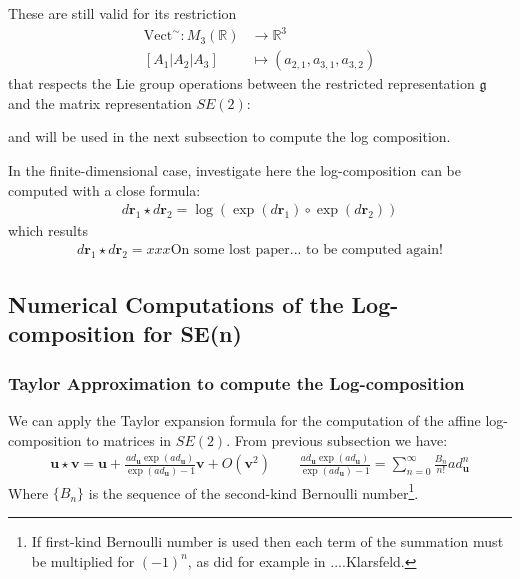 These are still valid for its restriction 
\begin{align*}
\text{Vect}^{\sim} : M_{3}(\mathbb{R}) & \longrightarrow \mathbb{R}^{3}\\
[A_1 \big| A_2  \big| A_3]
&\longmapsto  
(a_{2,1}, a_{3,1}, a_{3,2})
\end{align*}
that respects the Lie group operations between the restricted representation $\mathfrak{g}$ and the matrix representation $SE(2)$:


and will be used in the next subsection to compute the log composition.













In the finite-dimensional case, investigate here the log-composition can be computed with a close formula:
\begin{align*}
d\mathbf{r}_{1}\star d\mathbf{r}_{2} =  \log(\exp(d\mathbf{r}_1)\circ \exp(d\mathbf{r}_2)) 
\end{align*}
which results
\begin{align*}
d\mathbf{r}_{1}\star d\mathbf{r}_{2} 
= 
xxx \text{On some lost paper... to be computed again!}
\end{align*}

\subsection{Numerical Computations of the Log-composition for SE(n)}


\subsubsection{Taylor Approximation to compute the Log-composition}

We can apply the Taylor expansion formula for the computation of the affine log-composition to matrices in $SE(2)$.
From previous subsection we have:
\begin{align*}
\mathbf{u}\star \mathbf{v}  = \mathbf{u} + \frac{ ad_{\mathbf{u}} \exp(ad_{\mathbf{u}}) }{ \exp(ad_{\mathbf{u}}) - 1 }  \mathbf{v} + O({\mathbf{v}}^2)
\qquad
\frac{ ad_{\mathbf{u}} \exp(ad_{\mathbf{u}}) }{ \exp(ad_{\mathbf{u}}) - 1 }  = \sum_{n=0}^{\infty} \frac{B_{n}}{n!} ad_{\mathbf{u}}^{n} 
\end{align*}
Where $\lbrace B_{n} \rbrace $ is the sequence of the second-kind Bernoulli number\footnote{If first-kind Bernoulli number is used then each term of the summation must be multiplied for $(-1)^{n}$, as did for example in ....Klarsfeld.}.



